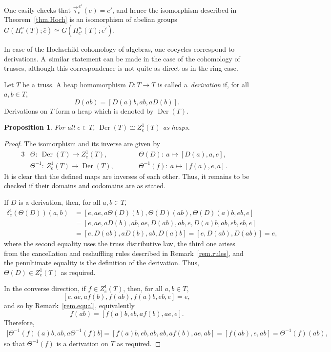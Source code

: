 \documentclass[pdftex]{sigma}
\numberwithin{equation}{section}
\newtheorem{Proposition}[Theorem]{Proposition}
 { \theoremstyle{definition}
\newtheorem{Definition}[Theorem]{Definition}
\newtheorem{Note}[Theorem]{Note}
\newtheorem{Example}[Theorem]{Example}
\newtheorem{Remark}[Theorem]{Remark}}
\begin{document}
\begin{Remark}\label{rem.iso.gr}
 One easily checks that $\vec{\tau}_e^{\,e'}(e) =e'$, and hence the isomorphism described in Theorem~\ref{thm.Hoch} is an isomorphism of abelian groups $G(H^n_e(T);\bar{e})\simeq G(H^n_{e'}(T); \overline{e'})$.
\end{Remark}

In case of the Hochschild cohomology of algebras, one-cocycles correspond to derivations. A~similar statement can be made in the case of the cohomology of trusses, although this correspondence is not quite as direct as in the ring case.

\begin{Definition}
 Let $T$ be a truss. A heap homomorphism $D\colon T\to T$ is called a~\textit{derivation} if, for all $a,b\in T$,
 \[
 D(ab) = [D(a)b, ab, aD(b)].
 \]
 Derivations on $T$ form a heap which is denoted by $\operatorname{Der}(T)$.
\end{Definition}

\begin{Proposition}
 For all $e\in T$, $\operatorname{Der}(T)\cong Z_e^1(T)$ as heaps.
\end{Proposition}
\begin{proof}
 The isomorphism and its inverse are given by
 \begin{alignat*}{3}%
 &\Theta\colon\ \operatorname{Der}(T)\to Z^1_e(T),\qquad && \Theta(D)\colon\ a\mapsto [D(a),a,e],&
 \\
 & \Theta^{-1}\colon\ Z^1_e(T) \to \operatorname{Der}(T), \qquad&& \Theta^{-1}(f)\colon\ a\mapsto [f(a),e,a].&
 \end{alignat*}
It is clear that the defined maps are inverses of each other. Thus, it remains to be checked if their domains and codomains are as stated.

If $D$ is a derivation, then, for all $a,b\in T$,
\begin{align*}
 \delta_e^1(\Theta(D))(a,b) &= [e,ae,a\Theta(D)(b), \Theta(D)(ab), \Theta(D)(a)b, eb, e]\\
 &= [e,ae,aD(b),ab,ae, D(ab), ab,e,D(a)b, ab, eb,eb,e]\\
 &=[e,D(ab), aD(b),ab, D(a)b] = [e,D(ab), D(ab)] =e,
\end{align*}
where the second equality uses the truss distributive law, the third one arises from the cancellation and reshuffling rules described in Remark~\ref{rem.rules}, and the penultimate equality is the definition of the derivation. Thus, $\Theta(D) \in Z_e^1(T)$ as required.

In the converse direction, if $f\in Z_e^1(T)$, then, for all $a,b\in T$,
\[
[e, ae, af(b), f(ab), f(a)b, eb, e]= e,
\]
and so by Remark~\ref{rem.equal}, equivalently
\[
f(ab) = [f(a)b, eb, af(b),ae, e].
\]
Therefore,
\begin{align*}
 \big[\Theta^{-1}(f)(a)b,ab,a\Theta^{-1}(f)b\big] = [f(a)b,eb,ab,ab,af(b),ae,ab]= [f(ab),e,ab] = \Theta^{-1}(f)(ab),
\end{align*}
so that $\Theta^{-1}(f)$ is a derivation on $T$ as required.
\end{proof}
\end{document}
